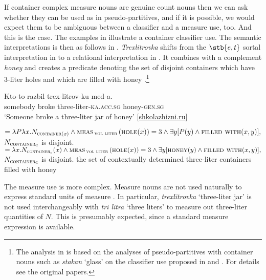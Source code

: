 \documentclass[output=paper]{langscibook}
\begin{document}
\noindent If container complex measure nouns are genuine count nouns then we can ask whether they can be used as in pseudo-partitives, and if it is possible, we would expect them to be ambiguous between a classifier and a measure use, too. And this is the case. The examples in  illustrate a container classifier use. The semantic interpretations is then as follows in . \textit{Trexlitrovka} shifts from the $\stb{e,t}$ sortal interpretation in  to a relational interpretation in . It combines with a complement \textit{honey} and creates a predicate denoting the set of disjoint containers which have 3-liter holes and which are filled with honey .\footnote{The analysis in  is based on the analyses of  pseudo-partitives with container nouns such as \textit{stakan} `glass' on the classifier use proposed in \citet{Partee.Borschev2012} and \citet{Khrizman2016,Khrizman2016b}. For details see the original papers.}

\ea\label{ex:khrizmann:29}
    \ea\label{ex:khrizmann:29a} \gll Kto-to razbil trex-litrov-ku med-a.\\
    somebody broke three-liter-\textsc{ka.acc.sg} honey-\textsc{gen.sg}\\
    \glt `Someone broke a three-liter jar of honey' \hfill [\href{http://shkolazhizni.ru/psychology/articles/57018/}{shkolazhizni.ru}]
\z\z

\ea\label{ex:khrizmann:30}
    \ea\label{ex:khrizmann:30a}  $= \lambda P \lambda x.N_{\textsc{container}(x)} \wedge \textsc{meas}\,_{\textsc{vol liter}}\,(\textsc{hole}(x)) = 3 \wedge \exists y [P(y) \wedge \textsc{filled with}(x,y)],$
    {\small $N_{\textsc{container}\textsubscript{c}}$ is disjoint.}
    \ex\label{ex:khrizmann:30b}  $= \lambda x.N_{\textsc{container}_{c}}(x) \wedge \textsc{meas}\,_{\textsc{vol liter}}\,(\textsc{hole}(x)) = 3 \wedge \exists y [\textsc{honey}(y) \wedge \textsc{filled with}(x,y)],$
    {\small $N_{\textsc{container}\textsubscript{c}}$ is disjoint.}
    \z
{\small the set of contextually determined three-liter containers filled with honey}
\z

\noindent The measure use is more complex. Measure nouns are not used naturally to express standard units of measure . In particular, \textit{trexlitrovka} `three-liter jar' is not used interchangeably with \textit{tri litra} `three liters' to measure out three-liter quantities of $N$. This is presumably expected, since a standard measure expression is available.
\end{document}
